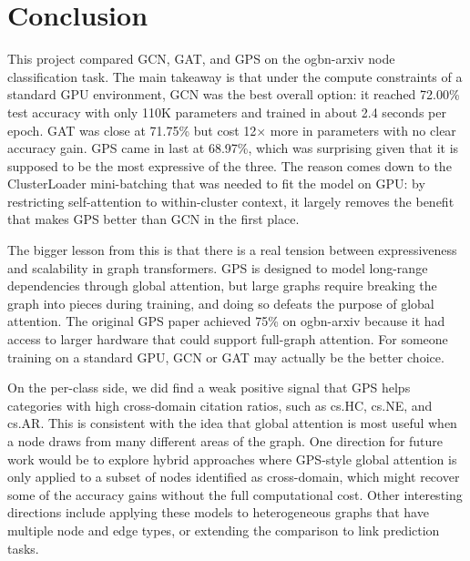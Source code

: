 \documentclass[conference]{IEEEtran}
\begin{document}
\section{Conclusion}

This project compared GCN, GAT, and GPS on the ogbn-arxiv node classification task.
The main takeaway is that under the compute constraints of a standard GPU environment,
GCN was the best overall option: it reached 72.00\% test accuracy with only 110K parameters
and trained in about 2.4 seconds per epoch. GAT was close at 71.75\% but cost 12$\times$
more in parameters with no clear accuracy gain. GPS came in last at 68.97\%, which was
surprising given that it is supposed to be the most expressive of the three. The reason
comes down to the ClusterLoader mini-batching that was needed to fit the model on GPU: by
restricting self-attention to within-cluster context, it largely removes the benefit that
makes GPS better than GCN in the first place.

The bigger lesson from this is that there is a real tension between expressiveness and
scalability in graph transformers. GPS is designed to model long-range dependencies through
global attention, but large graphs require breaking the graph into pieces during training,
and doing so defeats the purpose of global attention. The original GPS paper achieved 75\%
on ogbn-arxiv because it had access to larger hardware that could support full-graph
attention. For someone training on a standard GPU, GCN or GAT may actually be the better
choice.

On the per-class side, we did find a weak positive signal that GPS helps categories with
high cross-domain citation ratios, such as cs.HC, cs.NE, and cs.AR. This is consistent
with the idea that global attention is most useful when a node draws from many different
areas of the graph. One direction for future work would be to explore hybrid approaches
where GPS-style global attention is only applied to a subset of nodes identified as
cross-domain, which might recover some of the accuracy gains without the full
computational cost. Other interesting directions include applying these models to
heterogeneous graphs that have multiple node and edge types, or extending the comparison
to link prediction tasks.
\end{document}
